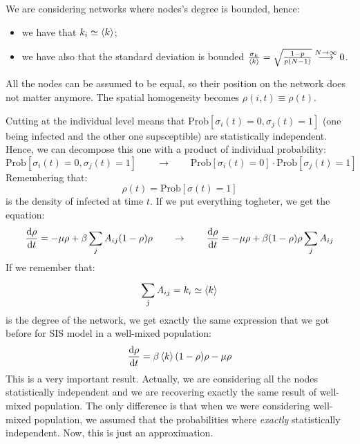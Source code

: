 \documentclass[../main/main.tex]{subfiles}
\begin{document}
We are considering networks where nodes's degree is bounded, hence:
\begin{itemize}
\item we have that \( k_i \simeq \expval{k}  \);
\item we have also that the standard deviation is bounded \( \frac{\sigma _k}{\expval{k} } = \sqrt{ \frac{1-p}{p(N-1)} } \overset{N \rightarrow \infty }{\longrightarrow} 0\).
\end{itemize}
All the nodes can be assumed to be equal, so their position on the network does not matter anymore. The spatial homogeneity becomes \( \rho (i,t) \equiv \rho (t) \).

Cutting at the individual level means that \( \text{Prob} [\sigma _i (t) = 0, \sigma _j (t ) =1 ] \) (one being infected and the other one supsceptible) are statistically independent. Hence, we can decompose this one with a product of individual probability:
\begin{equation*}
  \text{Prob} [\sigma _i (t) = 0, \sigma _j (t ) =1 ] \qquad \rightarrow \qquad \text{Prob} [\sigma _i (t) = 0] \cdot \text{Prob} [\sigma _j (t ) =1 ]
\end{equation*}
Remembering that:
\begin{equation*}
  \rho (t) = \text{Prob} [\sigma (t)=1]
\end{equation*}
is the density of infected at time \( t \).
If we put everything togheter, we get the equation:
\begin{equation*}
  \dv{\rho }{t} = - \mu \rho  + \beta \sum_{j}^{} A_{ij} (1- \rho ) \rho \qquad \rightarrow \qquad
   \dv{\rho }{t} = - \mu \rho  + \beta (1- \rho ) \rho \sum_{j}^{} A_{ij}
\end{equation*}
If we remember that:
\begin{equation}
  \sum_{j}^{} A_{ij} = k_i \simeq \expval{k}
\end{equation}
is the degree of the network, we get exactly the same expression that we got before for SIS model in a well-mixed population:
\begin{equation}
  \dv{\rho }{t} = \beta \expval{k} (1- \rho ) \rho - \mu \rho
\end{equation}
This is a very important result. Actually, we are considering all the nodes statistically independent and we are recovering exactly the same result of well-mixed population. The only difference is that when we were considering well-mixed population, we assumed that the probabilities where \emph{exactly} statistically independent. Now, this is just an approximation.
\end{document}
